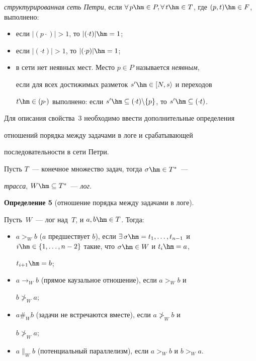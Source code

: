 \textit{структурированная сеть Петри}, если  $\forall\, p\hm\in P, \forall\,t\hm\in 

T$, где $(p,t)\hm\in F$, выполнено:

  \begin{itemize}

\item если $\vert (p\cdot)\vert >1$, то $\vert (\cdot t)\vert \hm=1$;

\item если $\vert (\cdot t)\vert >1$, то $\vert (\cdot p)\vert \hm=1$;

\item в сети нет неявных мест. Место $p\in P$ называется \textit{неявным}, 

если для всех достижимых разметок $s^\prime \hm\in [N,s\rangle$ и переходов 

$t\hm\in (p\cdot)$ выполнено: если $s^\prime\hm\subseteq (\cdot t)\backslash 

\{p\}$, то $s^\prime \hm\subseteq (\cdot t)$.

\end{itemize}

  

  Для описания свойства~3 необходимо ввести дополнительные определения 

отношений порядка между задачами в логе и срабатывающей 

последовательности в сети Петри.

  

  Пусть $T$~--- конечное множество задач, тогда $\sigma\hm\in T^*$~--- 

\textit{трасса}, $W\hm\subseteq T^*$~---  \textit{лог}.

  

  \smallskip

  

  \noindent

  \textbf{Определение 5} (отношение порядка между задачами в логе). 

Пусть~$W$~--- лог над~$T$, и $a,b\hm\in T$. Тогда:

  \begin{itemize}

  \item $a >_W b$ ($a$ предшествует $b$), если $\exists\,\sigma\hm= t_1, \ldots ,

t_{n-1}$ и $i\hm\in \{1,\ldots , n-2\}$ такие, что $\sigma\hm\in W$ и $t_i\hm=a$, 

$t_{i+1}\hm=b$;

  \item $a \to_W b$ (прямое каузальное отношение), если $a>_W b$ и 

$b\not>_W a$;

  \item $a \#_W b$ (задачи не встречаются вместе), если $a\not>_W b$ и 

$b\not>_W a$;

  \item $a \|_W b$ (потенциальный параллелизм), если $a >_W b$ и $b>_W 

a$.

  \end{itemize}


